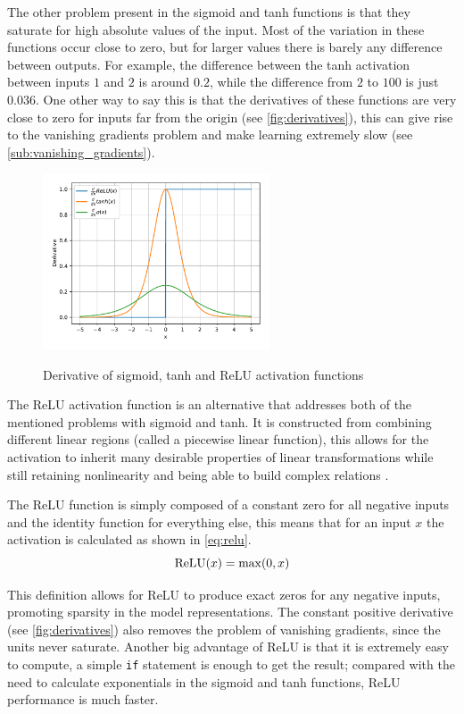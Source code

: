 The other problem present in the sigmoid and \gls{tanh} functions is that they saturate for high absolute values of the input. Most of the variation in these functions occur close to zero, but for larger values there is barely any difference between outputs. For example, the difference between the \gls{tanh} activation between inputs $1$ and $2$ is around $0.2$, while the difference from $2$ to $100$ is just $0.036$. One other way to say this is that the derivatives of these functions are very close to zero for inputs far from the origin (see \autoref{fig:derivatives}), this can give rise to the vanishing gradients problem and make learning extremely slow (see \autoref{sub:vanishing_gradients}).
%
\begin{figure}[hbt]
    \centering
    \caption{Derivative of sigmoid, tanh and ReLU activation functions}
    \includegraphics[width=0.6\textwidth]{chapters/NeuralNets/figures/Derivatives.pdf}
    \label{fig:derivatives}
\end{figure}

The \gls{ReLU} activation function is an alternative that addresses both of the mentioned problems with sigmoid and \gls{tanh}. It is constructed from combining different linear regions (called a piecewise linear function), this allows for the activation to inherit many desirable properties of linear transformations while still retaining nonlinearity and being able to build complex relations \cite{deepLearningBook2016}.

The \gls{ReLU} function is simply composed of a constant zero for all negative inputs and the identity function for everything else, this means that for an input $x$ the activation is calculated as shown in \autoref{eq:relu}.
\begin{equation} \label{eq:relu}
    \operatorname{ReLU}(x) = \max(0, x)
\end{equation}

This definition allows for \gls{ReLU} to produce exact zeros for any negative inputs, promoting sparsity in the model representations. The constant positive derivative (see \autoref{fig:derivatives}) also removes the problem of vanishing gradients, since the units never saturate. Another big advantage of \gls{ReLU} is that it is extremely easy to compute, a simple \texttt{if} statement is enough to get the result; compared with the need to calculate exponentials in the sigmoid and \gls{tanh} functions, \gls{ReLU} performance is much faster.

